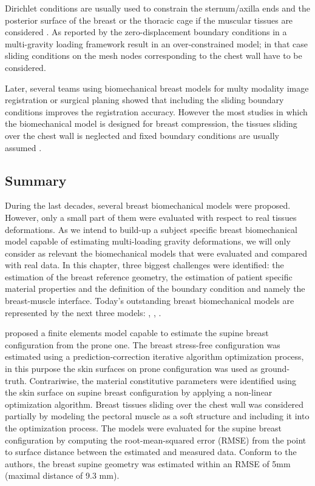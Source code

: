Dirichlet conditions are usually used to constrain the sternum/axilla ends and the posterior surface of the breast or the thoracic cage if the muscular tissues are considered \citep{griesenauer_breast_2017,rajagopal_creating_2008,pathmanathan_predicting_2008, gamage_modelling_2012,griesenauer_breast_2017}. As reported by \cite{carter_biomechanical_2009} the zero-displacement boundary conditions in a multi-gravity loading framework result in an over-constrained model; in that case sliding conditions on the mesh nodes corresponding to the chest wall have to be considered.    

  Later, several teams using biomechanical breast models for multy modality image registration or surgical planing showed that including the sliding boundary conditions \citep{georgii_simulation_2016,han_nonlinear_2014}  improves the registration accuracy. However the most studies in which the biomechanical model is designed for breast compression, the tissues sliding over the chest wall is neglected and fixed boundary conditions are usually assumed \citep{sturgeon_finite_element_2016, martinez_finite_2017}.
  
 \subsection{Summary}
 
 During the last decades, several breast biomechanical models were proposed. However, only a small part of them \citep{carter_biomechanical_2009,gamage_modelling_2012,han_nonlinear_2014} were evaluated with respect to real tissues deformations. As we intend to build-up a subject specific breast biomechanical model capable of estimating multi-loading gravity deformations, we will only consider as relevant the biomechanical models that were evaluated and compared with real data. In this chapter, three biggest challenges were identified:  the estimation of the breast reference geometry, the estimation of patient specific material properties and the definition of the boundary condition and namely the breast-muscle interface. Today's outstanding breast biomechanical models are represented by the next three models:   \cite{eiben_surface_2016}, \cite{han_nonlinear_2014}, \cite{gamage_modelling_2012}.   

 \cite{gamage_modelling_2012} proposed a finite elements model capable to estimate the supine breast configuration from the prone one. The breast stress-free configuration was estimated using a prediction-correction iterative algorithm optimization process, in this purpose the skin surfaces on prone configuration was used as ground-truth. Contrariwise, the material constitutive parameters were identified using the skin surface on supine breast configuration by applying a non-linear optimization algorithm. Breast tissues sliding over the chest wall was considered partially by modeling the pectoral muscle as a soft structure and including it into the optimization process. The models were evaluated for the supine breast configuration by computing the root-mean-squared error (RMSE) from the point to surface distance between the estimated and measured data. Conform to the authors, the breast supine geometry was estimated within an RMSE of 5mm (maximal distance of 9.3 mm). 

